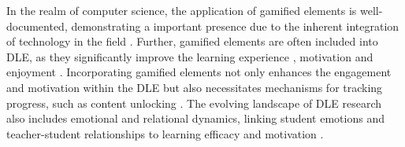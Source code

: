 In the realm of computer science, the application of gamified elements is well-documented, demonstrating a important presence due to the inherent integration of technology in the field \parencite{dichevGamifyingEducationWhat2017}.
Further, gamified elements are often included into DLE, as they significantly improve the learning experience \parencite{dermevalGaTOOntologicalModel2019}, motivation and enjoyment \parencite{gonzalezGamificationIntelligentTutoring2014, jacksonMotivationPerformanceGamebased2013}.
Incorporating gamified elements not only enhances the engagement and motivation within the DLE but also necessitates mechanisms for tracking progress, such as content unlocking \parencite{gonzalezGamificationIntelligentTutoring2014}.
The evolving landscape of DLE research also includes emotional and relational dynamics, linking student emotions and teacher-student relationships to learning efficacy and motivation \parencite{woolfAffectiveTutorsAutomatic2010}.


